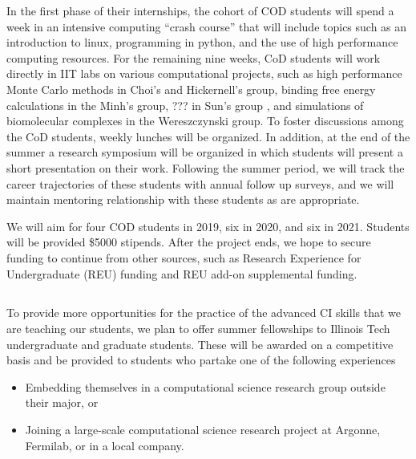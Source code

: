 \documentclass[11pt]{NSFamsart}
\begin{document}
In the first phase of their internships, the cohort of COD students will spend a week in an intensive computing ``crash course''  that will include topics such as an introduction to linux, programming in python, and the use of high performance computing resources.  For the remaining nine weeks, CoD students will work directly in IIT labs on various computational projects, such as high performance Monte Carlo methods in Choi's and Hickernell's group, binding free energy calculations in the Minh's group, ??? in Sun's group , and simulations of biomolecular complexes in the Wereszczynski group.  To foster discussions among the CoD students, weekly lunches will be organized.  In addition, at the end of the summer a research symposium will be organized in which students will present a short presentation on their work.  Following the summer period, we will track the career trajectories of these students with annual follow up surveys, and we will maintain mentoring relationship with these students as are appropriate. 

We will aim for four COD students in 2019, six in 2020, and six in 2021.  Students will be provided \$5000 stipends.  After the project ends, we hope to secure funding to continue from other sources, such as Research Experience for Undergraduate (REU) funding and REU add-on supplemental funding.


\subsection{\FellowName} \label{Fellow}
To provide more opportunities for the practice of the advanced CI skills that we are teaching our students, we plan to offer summer fellowships to Illinois Tech undergraduate and graduate students.  These will be awarded on a competitive basis and be provided to students who partake one of the following experiences
\begin{itemize}
\item Embedding themselves in a computational science research group outside their major, or
\item Joining a large-scale computational science research project at Argonne, Fermilab, or in a local company.
\end{itemize}
\end{document}
